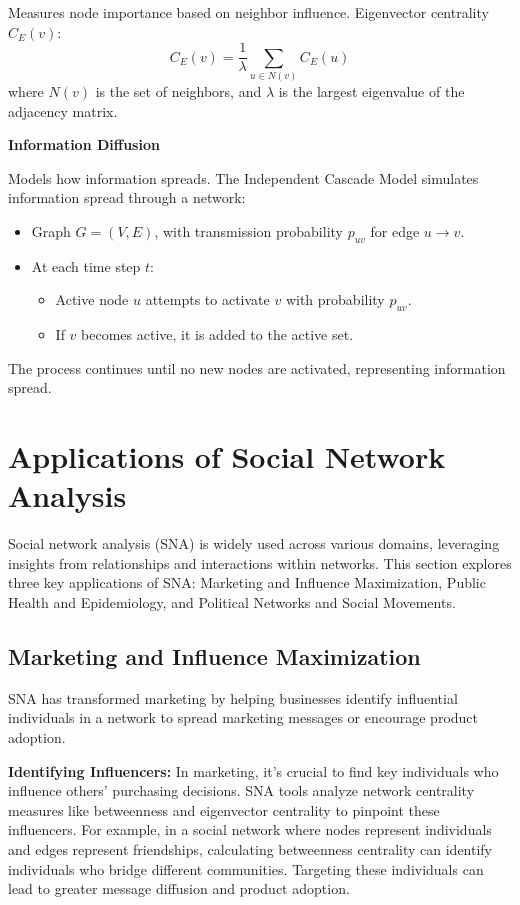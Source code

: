 \documentclass[12pt]{book} %
\begin{document}
Measures node importance based on neighbor influence. Eigenvector centrality \(C_E(v)\):
\[ C_E(v) = \frac{1}{\lambda} \sum_{u \in N(v)} C_E(u) \]
where \(N(v)\) is the set of neighbors, and \(\lambda\) is the largest eigenvalue of the adjacency matrix.

\textbf{Information Diffusion}

Models how information spreads. The Independent Cascade Model simulates information spread through a network:
\begin{itemize}
    \item Graph \(G = (V, E)\), with transmission probability \(p_{uv}\) for edge \(u \rightarrow v\).
    \item At each time step \(t\):
    \begin{itemize}
        \item Active node \(u\) attempts to activate \(v\) with probability \(p_{uv}\).
        \item If \(v\) becomes active, it is added to the active set.
    \end{itemize}
\end{itemize}
The process continues until no new nodes are activated, representing information spread.


\section{Applications of Social Network Analysis}

Social network analysis (SNA) is widely used across various domains, leveraging insights from relationships and interactions within networks. This section explores three key applications of SNA: Marketing and Influence Maximization, Public Health and Epidemiology, and Political Networks and Social Movements.

\subsection{Marketing and Influence Maximization}

SNA has transformed marketing by helping businesses identify influential individuals in a network to spread marketing messages or encourage product adoption.

\textbf{Identifying Influencers:}
In marketing, it's crucial to find key individuals who influence others' purchasing decisions. SNA tools analyze network centrality measures like betweenness and eigenvector centrality to pinpoint these influencers. For example, in a social network where nodes represent individuals and edges represent friendships, calculating betweenness centrality can identify individuals who bridge different communities. Targeting these individuals can lead to greater message diffusion and product adoption.
\end{document}

